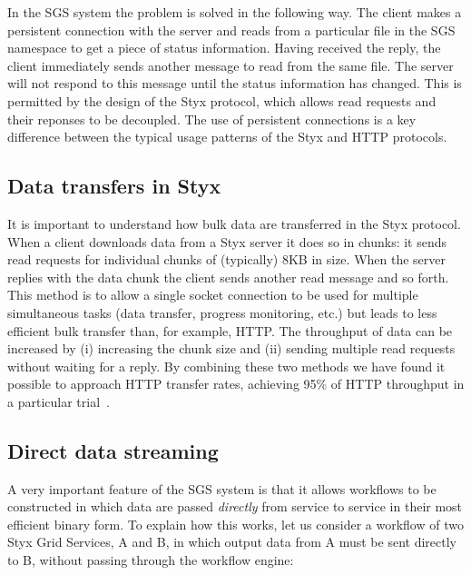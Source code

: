 \documentclass[a4paper]{article}
\begin{document}
In the SGS system the problem is solved in the following way.  The client makes a persistent connection with the server and reads from a particular file in the SGS namespace to get a piece of status information.  Having received the reply, the client immediately sends another message to read from the same file.  The server will not respond to this message until the status information has changed.  This is permitted by the design of the Styx protocol, which allows read requests and their reponses to be decoupled.  The use of persistent connections is a key difference between the typical usage patterns of the Styx and HTTP protocols.

\subsection{Data transfers in Styx}\label{sec:datatransfer}
It is important to understand how bulk data are transferred in the Styx protocol.  When a client downloads data from a Styx server it does so in chunks: it sends read requests for individual chunks of (typically) 8KB in size.  When the server replies with the data chunk the client sends another read message and so forth.  This method is to allow a single socket connection to be used for multiple simultaneous tasks (data transfer, progress monitoring, etc.) but leads to less efficient bulk transfer than, for example, HTTP.  The throughput of data can be increased by (i) increasing the chunk size and (ii) sending multiple read requests without waiting for a reply.  By combining these two methods we have found it possible to approach HTTP transfer rates, achieving 95\% of HTTP throughput in a particular trial~\cite{blower:2004}.

\subsection{Direct data streaming}\label{sec:datapassing}
A very important feature of the SGS system is that it allows workflows to be constructed in which data are passed \textit{directly} from service to service in their most efficient binary form.  To explain how this works, let us consider a workflow of two Styx Grid Services, A and B, in which output data from A must be sent directly to B, without passing through the workflow engine:
\end{document}
